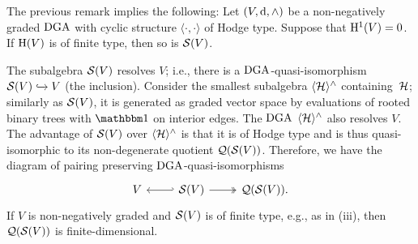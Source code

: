 \documentclass[\MainFolder/Text.tex]{subfiles}
\begin{document}
\begin{Remark}
\begin{RemarkList}
\item The previous remark implies the following: Let $(V,\mathrm{d},\wedge)$ be a non-negatively graded $\mathrm{DGA}$ with cyclic structure $\langle\cdot,\cdot\rangle$ of Hodge type. Suppose that $\mathrm{H}^1(V)=0$. If $\mathrm{H}(V)$ is of finite type, then so is $\mathcal{S}(V)$.
\item The subalgebra $\mathcal{S}(V)$ resolves $V$; i.e., there is a $\mathrm{DGA}$-quasi-isomorphism $\mathcal{S}(V) \xhookrightarrow{} V$ (the inclusion). Consider the smallest subalgebra $\langle\mathcal{H}\rangle^\wedge$ containing~$\mathcal{H}$; similarly as $\mathcal{S}(V)$, it is generated as graded vector space by evaluations of rooted binary trees with $\Id$ on interior edges. The $\mathrm{DGA}$ $\langle\mathcal{H}\rangle^\wedge$ also resolves $V$. The advantage of $\mathcal{S}(V)$ over $\langle\mathcal{H}\rangle^\wedge$ is that  it is of Hodge type and is thus quasi-isomorphic to its non-degenerate quotient $\mathcal{Q}(\mathcal{S}(V))$. Therefore, we have the diagram of pairing preserving $\mathrm{DGA}$-quasi-isomorphisms
$$\begin{tikzcd}
 V & \VansSmall(V)\arrow[hook']{l} \arrow[two heads]{r} & \VansQuotient(\VansSmall(V)).
\end{tikzcd}$$
If $V$ is non-negatively graded and $\mathcal{S}(V)$ is of finite type, e.g., as in (iii), then $\mathcal{Q}(\mathcal{S}(V))$ is finite-dimensional.\qedhere
\end{RemarkList}
\end{Remark}
\end{document}
